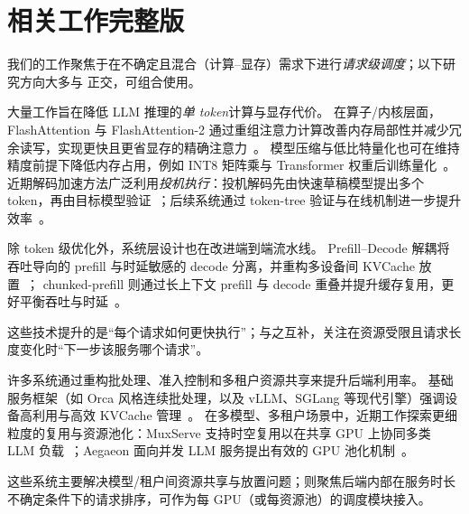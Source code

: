 \newpage
\appendix
\onecolumn

\section{相关工作完整版}
我们的工作聚焦于在不确定且混合（计算--显存）需求下进行\emph{请求级调度}；以下研究方向大多与 \oursched 正交，可组合使用。

大量工作旨在降低 LLM 推理的\emph{单 token}计算与显存代价。
在算子/内核层面，FlashAttention 与 FlashAttention-2 通过重组注意力计算改善内存局部性并减少冗余读写，实现更快且更省显存的精确注意力~\cite{dao2022flashattention,dao2023flashattention}。
模型压缩与低比特量化也可在维持精度前提下降低内存占用，例如 INT8 矩阵乘与 Transformer 权重后训练量化~\cite{dettmers2022gpt3,frantar2022gptq}。
近期解码加速方法广泛利用\emph{投机执行}：投机解码先由快速草稿模型提出多个 token，再由目标模型验证~\cite{leviathan2023speculative}；后续系统通过 token-tree 验证与在线机制进一步提升效率~\cite{miao2023specinfer,liu2023online}。

除 token 级优化外，系统层设计也在改进端到端流水线。
Prefill--Decode 解耦将吞吐导向的 prefill 与时延敏感的 decode 分离，并重构多设备间 KVCache 放置~\cite{zhong2024distserve,qin2024mooncake,hu2024memserve,hu2024inference}；
chunked-prefill 则通过长上下文 prefill 与 decode 重叠并提升缓存复用，更好平衡吞吐与时延~\cite{agrawal2024taming,hu2024inference}。

这些技术提升的是“每个请求如何更快执行”；\oursched 与之互补，关注在资源受限且请求长度变化时“下一步该服务哪个请求”。

许多系统通过重构批处理、准入控制和多租户资源共享来提升后端利用率。
基础服务框架（如 Orca 风格连续批处理，以及 vLLM、SGLang 等现代引擎）强调设备高利用与高效 KVCache 管理~\cite{yu2022orca,kwon2023efficient,zheng2024sglang}。
在多模型、多租户场景中，近期工作探索更细粒度的复用与资源池化：MuxServe 支持时空复用以在共享 GPU 上协同多类 LLM 负载~\cite{duan2024muxserve}；Aegaeon 面向并发 LLM 服务提出有效的 GPU 池化机制~\cite{xiang2025aegaeon}。

这些系统主要解决模型/租户间资源共享与放置问题；\oursched 则聚焦后端内部在服务时长不确定条件下的请求排序，可作为每 GPU（或每资源池）的调度模块接入。

